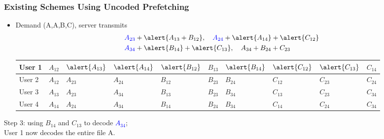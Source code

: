 \documentclass{beamer}
\begin{document}
\begin{frame}
\frametitle{Existing Schemes Using Uncoded Prefetching}
\begin{itemize}
\item Demand (A,A,B,C), server transmits
\begin{align*}
& \textcolor{blue}{A_{23}} +\alert{A_{13}+B_{12}}, \quad  \textcolor{blue}{A_{24}} +\alert{A_{14}}+\alert{C_{12}} \\
& \textcolor{blue}{A_{34}} +\alert{B_{14}}+\alert{C_{13}} ,\quad  A_{34} +B_{24}+C_{23}
\end{align*}
\begin{table}[]
\centering
\begin{tabular}{|l||l|l|l|l|l|l|l|l|l|}
\hline
User 1 & $A_{12}$ & $\alert{A_{13}}$ & $\alert{A_{14}}$ & $\alert{B_{12}}$ & $B_{13}$ & $\alert{B_{14}}$ & $\alert{C_{12}}$ & $\alert{C_{13}}$ & $C_{14}$ \\ \hline
User 2 & $A_{12}$ & $A_{23}$ & $A_{24}$ & $B_{12}$ & $B_{23}$ & $B_{24}$ & $C_{12}$ & $C_{23}$ & $C_{24}$ \\ \hline
User 3 & $A_{13}$ & $A_{23}$ & $A_{34}$ & $B_{13}$ & $B_{23}$ & $B_{34}$ & $C_{13}$ & $C_{23}$ & $C_{34}$ \\ \hline
User 4 & $A_{14}$ & $A_{24}$ & $A_{34}$ & $B_{14}$ & $B_{24}$ & $B_{34}$ & $C_{14}$ & $C_{24}$ & $C_{34}$ \\ \hline
\end{tabular}
\end{table}
\end{itemize}
Step 3: using \alert{$B_{14}$} and \alert{$C_{13}$} to decode \textcolor{blue}{$A_{34}$}; \\
User 1 now decodes the entire file A.
\end{frame}
\end{document}

